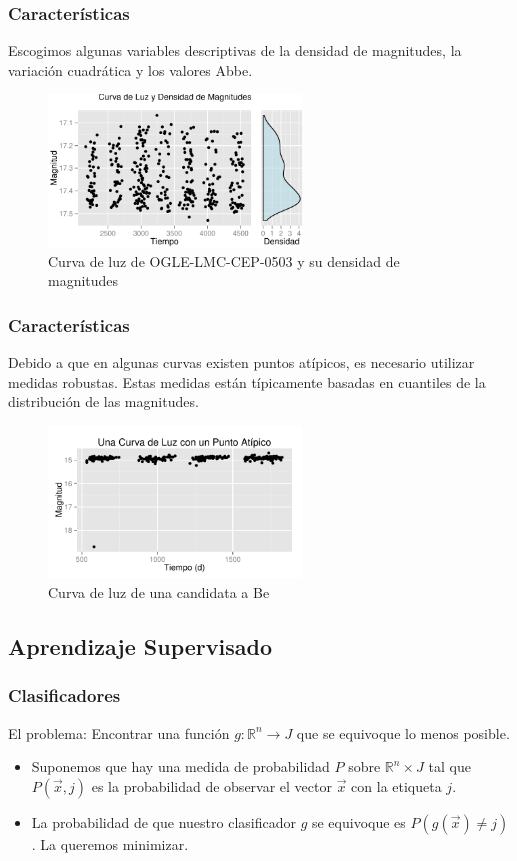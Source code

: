 \documentclass{beamer}
\begin{document}
\begin{frame}
  \frametitle{Características}
  Escogimos algunas variables descriptivas de la densidad de magnitudes, la variación cuadrática y los valores Abbe.
  \begin{figure}
    \centering
    \includegraphics[width=0.6\textwidth]{./img/curvaHist.pdf}
    \caption{ Curva de luz de OGLE-LMC-CEP-0503 y su densidad de magnitudes}
  \end{figure}%
\end{frame}

\begin{frame}
  \frametitle{Características}
  Debido a que en algunas curvas existen puntos atípicos, es necesario utilizar medidas robustas. Estas medidas están típicamente basadas en cuantiles de la distribución de las magnitudes. 
  \begin{figure}
    \centering
    \includegraphics[width=0.6\textwidth]{./img/curvaRara.pdf}
    \caption{ Curva de luz de una candidata a Be}
  \end{figure}%
\end{frame}

\subsection{Aprendizaje Supervisado}
\begin{frame}%
\frametitle{Clasificadores}
El problema: Encontrar una función $g:\mathbb{R}^n\to J  $ que se equivoque lo menos posible.
\begin{itemize}
  \item Suponemos que hay una medida de probabilidad $P$ sobre $\mathbb{R}^n\times J$ tal que $P(\vec{x}, j)$ es la probabilidad de observar el vector $\vec{x}$ con la etiqueta $j$.
  \item La probabilidad de que nuestro clasificador $g$ se equivoque es $P(g(\vec{x}) \neq j)$. La queremos minimizar.
  \end{itemize}
\end{frame}
\end{document}

